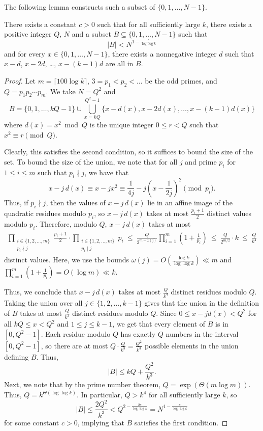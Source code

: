 \documentclass[11pt,reqno]{amsart}
\begin{document}
The following lemma constructs such a subset of 
$\{0,1,\dots,N-1\}$.
\begin{lemma}
\label{lem:arithmetic}
There exists a constant $c>0$ 
such that for all sufficiently large $k$,
there exists a positive integer $Q$, $N$ and a subset 
$B\subseteq \{0,1,\dots,N-1\}$ such that 
$$|B| < N^{1-\frac{c}{\log\log k}}$$
and for every $x\in\{0,1,\dots,N-1\}$,
there exists a nonnegative integer $d$ such that 
$x-d$, $x-2d$, \dots, $x-(k-1)d$ are all in $B$.
\end{lemma}
\begin{proof}
Let $m=\lceil 100\log k\rceil$, $3=p_1<p_2<\dots$
be the odd primes, and $Q=p_1p_2\cdots p_m$.
We take $N=Q^2$ and
$$B = \{0,1,\dots,kQ-1\}\cup \bigcup_{x=kQ}^{Q^2-1} \{x-d(x), x-2d(x),\dots, 
x-(k-1)d(x)\}$$
where $d(x)=x^2\bmod Q$ is the unique integer $0\leq r < Q$
such that $x^2\equiv r\pmod Q$.

Clearly, this satisfies the second condition,
so it suffices to bound the size of the set.
To bound the size of the union, 
we note that for all $j$ and prime $p_i$
for $1\leq i\leq m$ such that $p_i\nmid j$,
we have that 
$$x-j\,d(x) \equiv x-jx^2 \equiv \frac{1}{4j} 
- j\left(x-\frac 1{2j}\right)^2\pmod{p_i}.$$
Thus, if $p_i\nmid j$, then the values of $x-j\,d(x)$
lie in an affine image of the quadratic residues modulo $p_i$,
so $x-j\,d(x)$ takes at most $\frac{p_i+1}2$ 
distinct values modulo $p_i$.
Therefore, modulo $Q$, $x-j\,d(x)$ takes at most 
\begin{align*}
\prod_{\substack{i\in\{1,2,\dots,m\} \\ 
p_i\nmid j}}\frac{p_i+1}2 
\cdot \prod_{\substack{i\in\{1,2,\dots,m\} \\ 
p_i\mid j}} p_i 
\ \leq\ \frac{Q}{2^{m-\omega(j)}} 
\prod_{i=1}^m \left(1+\frac 1{p_i}\right)
\ \leq\ \frac Q{2^{m/2}} \cdot k
\ \leq\ \frac Q{k^4}
\end{align*}
distinct values.
Here, we use the bounds $\omega(j) = O\left(\frac{\log k}{\log\log k}\right) \ll m$
and $\prod_{i=1}^m \left(1+\frac 1{p_i}\right) 
= O(\log m) \ll k$.

Thus, we conclude that $x-j\,d(x)$ takes
at most $\frac Q{k^4}$ distinct residues modulo $Q$.
Taking the union over all $j\in\{1,2,\dots,k-1\}$
gives that the union in the definition of $B$
takes at most $\frac Q{k^3}$ distinct residues modulo $Q$.
Since $0\leq x-jd(x) < Q^2$ for all $kQ\leq x<Q^2$ 
and $1\leq j\leq k-1$, we get that every element of $B$ is 
in $[0, Q^2-1]$.
Each residue modulo $Q$ has exactly $Q$ numbers 
in the interval $[0,Q^2-1]$,
so there are at most $Q\cdot \frac Q{k^3}=\frac{Q^2}{k^3}$
possible elements in the union defining $B$. Thus,
$$|B| \leq kQ + \frac{Q^2}{k^3}.$$
Next, we note that by the prime number theorem,
$Q = \exp(\Theta(m\log m))$.
Thus, $Q = k^{\Theta(\log\log k)}$.
In particular, $Q>k^4$ for all sufficiently
large $k$, so 
$$|B| \leq \frac{2Q^2}{k^3} < 
Q^{2-\frac{2c}{\log\log k}} = N^{1-\frac{c}{\log\log k}}$$
for some constant $c>0$,
implying that $B$ satisfies the first condition.
\end{proof}
\end{document}
